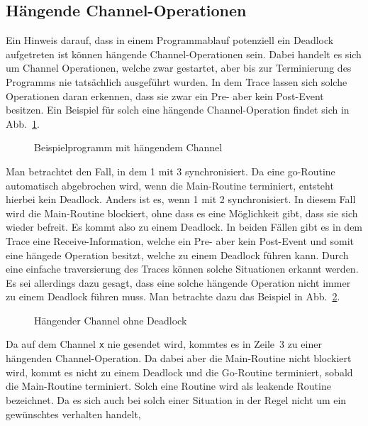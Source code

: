 \subsection{Hängende Channel-Operationen} 
Ein Hinweis darauf, dass in einem Programmablauf potenziell ein Deadlock aufgetreten ist können hängende Channel-Operationen
sein. Dabei handelt es sich um Channel Operationen, welche zwar gestartet, aber bis zur Terminierung des 
Programms nie tatsächlich ausgeführt wurden. In dem Trace lassen sich solche Operationen daran erkennen, dass sie 
zwar ein Pre- aber kein Post-Event besitzen. Ein Beispiel für solch eine hängende Channel-Operation findet sich in 
Abb.~\ref{Chap:Analyze-Sec:Channel-SubSec:Dangling-Fig:ExDangling}.
\begin{figure}[h!]
  
  \caption{Beispielprogramm mit hängendem Channel}
  \label{Chap:Analyze-Sec:Channel-SubSec:Dangling-Fig:ExDangling}
\end{figure}
Man betrachtet den Fall, in dem 1 mit 3 synchronisiert. Da eine go-Routine automatisch abgebrochen wird, 
wenn die Main-Routine terminiert, entsteht hierbei kein Deadlock. Anders ist es, wenn 1 mit 2 synchronisiert. 
In diesem Fall wird die Main-Routine blockiert, ohne dass es eine Möglichkeit gibt, dass sie sich wieder 
befreit. Es kommt also zu einem Deadlock. In beiden Fällen gibt es in dem Trace eine Receive-Information, 
welche ein Pre- aber kein Post-Event und somit eine hängede Operation besitzt, welche zu einem Deadlock 
führen kann. Durch eine einfache traversierung des Traces können solche Situationen erkannt werden. 
Es sei allerdings dazu gesagt, dass eine solche hängende Operation nicht immer zu einem Deadlock führen muss.
Man betrachte dazu das Beispiel in Abb.~\ref{Chap:Analyze-Sec:Channel-SubSec:Dangling-Fig:ExDanglingWithout}.
\begin{figure}[h!]
  
  \caption{Hängender Channel ohne Deadlock}
  \label{Chap:Analyze-Sec:Channel-SubSec:Dangling-Fig:ExDanglingWithout}
\end{figure}
Da auf dem Channel \texttt{x} nie gesendet wird, kommtes es in Zeile~3 zu einer hängenden Channel-Operation. Da 
dabei aber die Main-Routine nicht blockiert wird, kommt es nicht zu einem Deadlock und die Go-Routine 
terminiert, sobald die Main-Routine terminiert. Solch eine Routine wird als leakende Routine bezeichnet. 
Da es sich auch bei solch einer Situation in der Regel nicht um ein gewünschtes verhalten handelt, 
